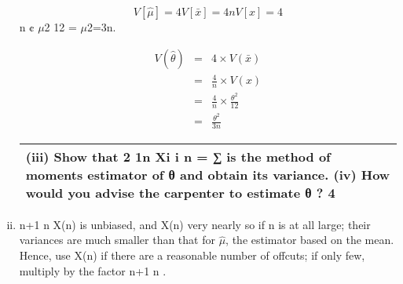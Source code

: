 \documentclass[a4paper,12pt]{article}
\begin{document}
\begin{enumerate}[(i)]
\[V [\hat{\mu}] = 4V [\bar{x}] = 4
nV [x] = 4\]
n ¢ $\mu$2
12 = $\mu$2=3n.

\begin{eqnarray*}
V(\hat{\theta}) &=& 4 \times V(\bar{x})\\
 &=& \frac{4}{n} \times V(x) \\
 &=& \frac{4}{n} \times \frac{\theta^2}{12} \\
 &=& \frac{\theta^2}{3n}
\end{eqnarray*}
  \begin{table}[ht!]
 \centering
 \begin{tabular}{|p{15cm}|}
 \hline  
(iii) Show that 
2 1n
Xi
i
n
= ∑ is the method of moments estimator of 
θ
 and obtain its variance.
(iv) How would you advise the carpenter to estimate 
θ
?
4\\ \hline
  \end{tabular}
\end{table}
\item n+1
n X(n) is unbiased, and X(n) very nearly so if n is at all large; their
variances are much smaller than that for $\hat{\mu}$, the estimator based on the mean.
Hence, use X(n) if there are a reasonable number of offcuts; if only few,
multiply by the factor n+1
n .
\end{enumerate}
\end{document}
